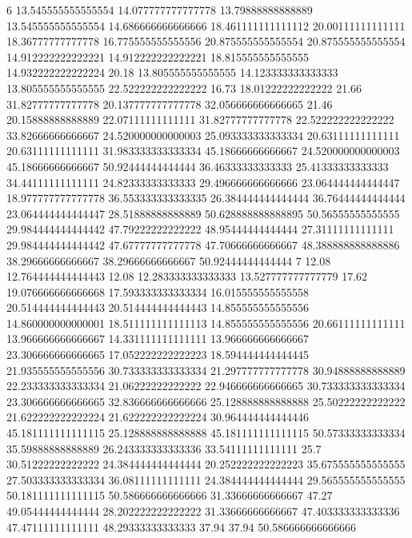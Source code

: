6 13.545555555555554 14.077777777777778 13.79888888888889 13.545555555555554 14.686666666666666 18.461111111111112 20.00111111111111 18.36777777777778 16.775555555555556 20.875555555555554 20.875555555555554 14.912222222222221 14.912222222222221 18.815555555555555 14.932222222222224 20.18 13.805555555555555 14.123333333333333 13.805555555555555 22.522222222222222 16.73 18.01222222222222 21.66 31.82777777777778 20.137777777777778 32.056666666666665 21.46 20.15888888888889 22.07111111111111 31.82777777777778 22.522222222222222 33.82666666666667 24.520000000000003 25.093333333333334 20.63111111111111 20.63111111111111 31.983333333333334 45.18666666666667 24.520000000000003 45.18666666666667 50.92444444444444 36.46333333333333 25.41333333333333 34.44111111111111 24.82333333333333 29.496666666666666 23.064444444444447 18.977777777777778 36.553333333333335 26.384444444444444 36.76444444444444 23.064444444444447 28.51888888888889 50.628888888888895 50.56555555555555 29.984444444444442 47.79222222222222 48.95444444444444 27.31111111111111 29.984444444444442 47.67777777777778 47.70666666666667 48.388888888888886 38.29666666666667 38.29666666666667 50.92444444444444
7 12.08 12.764444444444443 12.08 12.283333333333333 13.527777777777779 17.62 19.076666666666668 17.593333333333334 16.015555555555558 20.514444444444443 20.514444444444443 14.855555555555556 14.860000000000001 18.511111111111113 14.855555555555556 20.66111111111111 13.966666666666667 14.331111111111111 13.966666666666667 23.306666666666665 17.052222222222223 18.594444444444445 21.935555555555556 30.733333333333334 21.297777777777778 30.94888888888889 22.233333333333334 21.06222222222222 22.946666666666665 30.733333333333334 23.306666666666665 32.836666666666666 25.128888888888888 25.50222222222222 21.622222222222224 21.622222222222224 30.964444444444446 45.181111111111115 25.128888888888888 45.181111111111115 50.57333333333334 35.59888888888889 26.243333333333336 33.54111111111111 25.7 30.51222222222222 24.384444444444444 20.252222222222223 35.675555555555555 27.503333333333334 36.08111111111111 24.384444444444444 29.565555555555555 50.181111111111115 50.586666666666666 31.33666666666667 47.27 49.05444444444444 28.202222222222222 31.33666666666667 47.403333333333336 47.47111111111111 48.29333333333333 37.94 37.94 50.586666666666666
